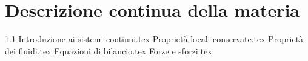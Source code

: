 %
\chapter{Descrizione continua della materia}
%
{1.1 Introduzione ai sistemi continui.tex}
{Proprietà locali conservate.tex}
{Proprietà dei fluidi.tex}
{Equazioni di bilancio.tex}
{Forze e sforzi.tex}